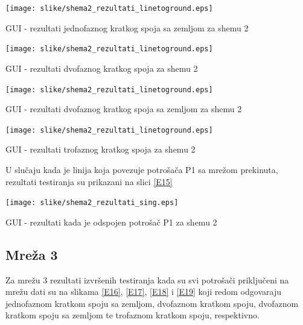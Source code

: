 \documentclass[a4paper, 12pt]{article}
\numberwithin{figure}{section}
\numberwithin{equation}{section}
\begin{document}
 \begin{center}
    \captionsetup{type=figure}
    \begin{center}
        \texttt{[image: slike/shema2\_rezultati\_linetoground.eps]}
        \caption{GUI - rezultati jednofaznog kratkog spoja sa zemljom za shemu 2}
        \label{E11}
    \end{center}
\end{center}

\begin{center}
    \captionsetup{type=figure}
    \begin{center}
        \texttt{[image: slike/shema2\_rezultati\_linetoground.eps]}
        \caption{GUI - rezultati dvofaznog kratkog spoja za shemu 2}
        \label{E12}
    \end{center}
\end{center}

\begin{center}
    \captionsetup{type=figure}
    \begin{center}
        \texttt{[image: slike/shema2\_rezultati\_linetoground.eps]}
        \caption{GUI - rezultati dvofaznog kratkog spoja sa zemljom za shemu 2}
        \label{E13}
    \end{center}
\end{center}

\begin{center}
    \captionsetup{type=figure}
    \begin{center}
        \texttt{[image: slike/shema2\_rezultati\_linetoground.eps]}
        \caption{GUI - rezultati trofaznog kratkog spoja za shemu 2}
        \label{E14}
    \end{center}
\end{center}

U slučaju kada je linija koja povezuje potrošača P1 sa mrežom prekinuta, rezultati testiranja su prikazani na slici \ref{E15}

\begin{center}
    \captionsetup{type=figure}
    \begin{center}
        \texttt{[image: slike/shema2\_rezultati\_sing.eps]}
        \caption{GUI - rezultati kada je odspojen potrošač P1 za shemu 2}
        \label{E15}
    \end{center}
\end{center}

\subsection{Mreža 3}
 Za mrežu 3 rezultati izvršenih testiranja kada su svi potrošači priključeni na mrežu dati su na slikama \ref{E16}, \ref{E17}, \ref{E18} i \ref{E19} koji redom odgovaraju jednofaznom kratkom spoju sa zemljom, dvofaznom kratkom spoju, dvofaznom kratkom spoju sa zemljom te trofaznom kratkom spoju, respektivno.
 
\end{document}
